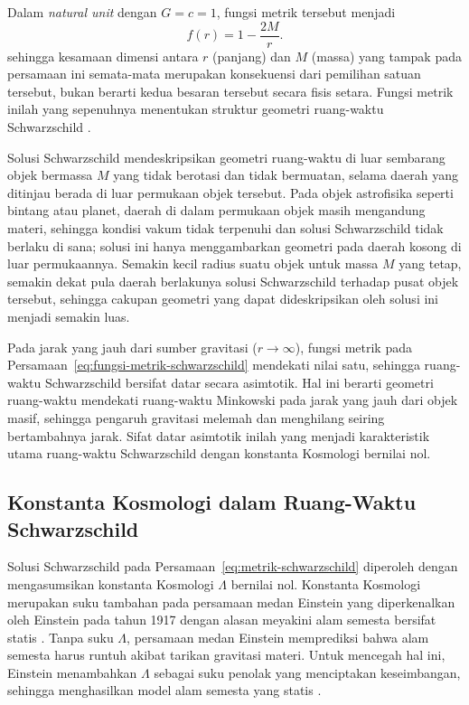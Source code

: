 Dalam \textit{natural unit} dengan $G=c=1$, fungsi metrik tersebut menjadi
\begin{equation}
f(r)=1-\frac{2M}{r}.
\label{eq:fungsi-metrik-schwarzschild}
\end{equation}
sehingga kesamaan dimensi antara $r$ (panjang) dan $M$ (massa) yang tampak pada persamaan 
ini semata-mata merupakan konsekuensi dari pemilihan satuan tersebut, bukan berarti kedua 
besaran tersebut secara fisis setara. Fungsi metrik inilah yang sepenuhnya menentukan 
struktur geometri ruang-waktu Schwarzschild \parencite{Wald1984}.

Solusi Schwarzschild mendeskripsikan geometri ruang-waktu di luar sembarang 
objek bermassa $M$ yang tidak berotasi dan tidak bermuatan, selama daerah yang ditinjau 
berada di luar permukaan objek tersebut. Pada objek astrofisika seperti bintang atau planet, 
daerah di dalam permukaan objek masih mengandung materi, sehingga kondisi vakum tidak 
terpenuhi dan solusi Schwarzschild tidak berlaku di sana; solusi ini hanya menggambarkan 
geometri pada daerah kosong di luar permukaannya. Semakin kecil radius suatu objek untuk 
massa $M$ yang tetap, semakin dekat pula daerah berlakunya solusi Schwarzschild terhadap 
pusat objek tersebut, sehingga cakupan geometri yang dapat dideskripsikan oleh solusi ini 
menjadi semakin luas.

Pada jarak yang jauh dari sumber gravitasi ($r \to \infty$), fungsi metrik 
pada Persamaan~\eqref{eq:fungsi-metrik-schwarzschild} mendekati nilai satu, sehingga 
ruang-waktu Schwarzschild bersifat datar secara asimtotik. Hal ini berarti geometri 
ruang-waktu mendekati ruang-waktu Minkowski pada jarak yang jauh dari objek masif, sehingga 
pengaruh gravitasi melemah dan menghilang seiring bertambahnya jarak. Sifat datar asimtotik 
inilah yang menjadi karakteristik utama ruang-waktu Schwarzschild dengan konstanta 
Kosmologi bernilai nol.

\subsection{Konstanta Kosmologi dalam Ruang-Waktu Schwarzschild}
\label{subsec:konstanta-Kosmologi}

\noindent Solusi Schwarzschild pada Persamaan~\eqref{eq:metrik-schwarzschild} 
diperoleh dengan mengasumsikan konstanta Kosmologi $\Lambda$ bernilai nol. Konstanta 
Kosmologi merupakan suku tambahan pada persamaan medan Einstein yang diperkenalkan oleh 
Einstein pada tahun 1917 dengan alasan meyakini alam semesta bersifat statis 
\parencite{Einstein1917}. Tanpa suku $\Lambda$, persamaan medan Einstein memprediksi bahwa 
alam semesta harus runtuh akibat tarikan gravitasi materi. Untuk mencegah hal ini, Einstein 
menambahkan $\Lambda$ sebagai suku penolak yang menciptakan keseimbangan, sehingga 
menghasilkan model alam semesta yang statis \parencite{Carroll2004}.

